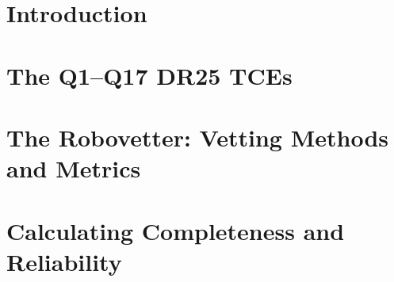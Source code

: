 \documentclass[apj,twocolappendix,numberedappendix]{emulateapj}
\renewcommand{\_}{\discretionary{\underscore}{}{\underscore}}  %
\begin{document}
\begin{abstract}


\end{abstract}


\section{Introduction}



\section{The Q1--Q17 DR25 TCEs}
\label{tcesec}





\section{The Robovetter: Vetting Methods and Metrics}


\section{Calculating Completeness and Reliability}

\end{document}
